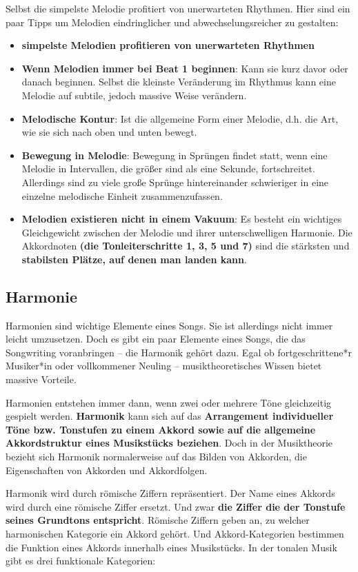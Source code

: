 Selbst die simpelste Melodie profitiert von unerwarteten Rhythmen. Hier sind ein paar Tipps um Melodien 
eindringlicher und abwechselungsreicher zu gestalten:
\begin{itemize}
    \item \textbf{simpelste Melodien profitieren von unerwarteten Rhythmen}
    \item \textbf{Wenn Melodien immer bei Beat 1 beginnen}: Kann sie kurz davor oder danach beginnen. Selbst die 
    kleinste Veränderung im Rhythmus kann eine Melodie auf subtile, jedoch massive Weise verändern.
    \item \textbf{Melodische Kontur}: Ist die allgemeine Form einer Melodie, d.h. die Art, wie sie sich nach 
    oben und unten bewegt.
    \item \textbf{Bewegung in Melodie}: Bewegung in Sprüngen findet statt, wenn eine Melodie in Intervallen, die 
    größer sind als eine Sekunde, fortschreitet. Allerdings sind zu viele große Sprünge hintereinander schwieriger 
    in eine einzelne melodische Einheit zusammenzufassen.
    \item \textbf{Melodien existieren nicht in einem Vakuum}: Es besteht ein wichtiges Gleichgewicht zwischen der 
    Melodie und ihrer unterschwelligen Harmonie. Die Akkordnoten \textbf{(die Tonleiterschritte 1, 3, 5 und 7)} sind die 
    stärksten und \textbf{stabilsten Plätze, auf denen man landen kann}.
    
\end{itemize}


\subsection{Harmonie}
Harmonien sind wichtige Elemente eines Songs. Sie ist allerdings nicht immer leicht umzusetzen. 
Doch es gibt ein paar Elemente eines Songs, die das Songwriting voranbringen – die Harmonik gehört dazu. 
Egal ob fortgeschrittene*r Musiker*in oder vollkommener Neuling – musiktheoretisches Wissen bietet massive Vorteile.

Harmonien entstehen immer dann, wenn zwei oder mehrere Töne gleichzeitig gespielt werden. \textbf{Harmonik} kann 
sich auf das \textbf{Arrangement individueller Töne bzw. Tonstufen zu einem Akkord sowie auf die allgemeine Akkordstruktur 
eines Musikstücks beziehen}. Doch in der Musiktheorie bezieht sich Harmonik normalerweise auf das Bilden 
von Akkorden, die Eigenschaften von Akkorden und Akkordfolgen.

Harmonik wird durch römische Ziffern repräsentiert. Der Name eines Akkords wird durch eine römische Ziffer
ersetzt. Und zwar \textbf{die Ziffer die der Tonstufe seines Grundtons entspricht}. Römische Ziffern geben an, 
zu welcher harmonischen Kategorie ein Akkord gehört. Und Akkord-Kategorien bestimmen die Funktion eines 
Akkords innerhalb eines Musikstücks. In der tonalen Musik gibt es drei funktionale Kategorien:

